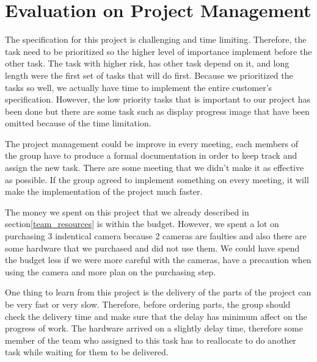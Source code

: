\section{Evaluation on Project Management}

The specification for this project is challenging and time limiting.
Therefore, the task need to be prioritized so the higher level of importance implement before the other task.
The task with higher risk, has other task depend on it, and long length were the first set of tasks that will do first.
Because we prioritized the tasks so well, we actually have time to implement the entire customer's specification.
However, the low priority tasks that is important to our project has been done but there are some task such as display progress image that have been omitted because of the time limitation.

The project management could be improve in every meeting, each members of the group have to produce a formal documentation in order to keep track and assign the new task.
There are some meeting that we didn't make it as effective as possible.
If the group agreed to implement something on every meeting, it will make the implementation of the project much faster. 

The money we spent on this project that we already described in section\ref{team_resources} is within the budget.
However, we spent a lot on purchasing 3 indentical camera because 2 cameras are faulties and also there are some hardware that we purchased and did not use them.
We could have spend the budget less if we were more careful with the cameras, have a precaution when using the camera and more plan on the purchasing step.

One thing to learn from this project is the delivery of the parts of the project can be very fast or very slow. 
Therefore, before ordering parts, the group should check the delivery time and make sure that the delay has minimum affect on the progress of work.
The hardware arrived on a slightly delay time, therefore some member of the team who assigned to this task has to reallocate to do another task while waiting for them to be delivered.













